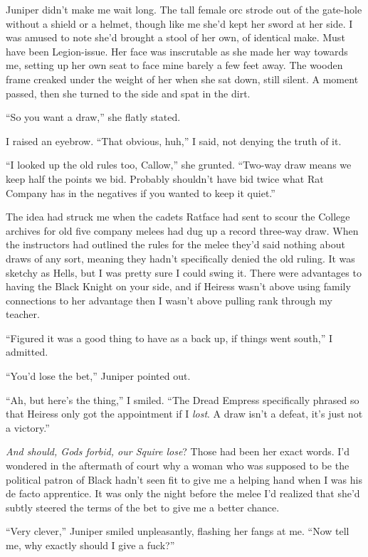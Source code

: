\documentclass[12pt, openany]{book}
\begin{document}
Juniper didn’t make me wait long. The tall female orc strode out of the gate-hole without a shield or a helmet, though like me she’d kept her sword at her side. I was amused to note she’d brought a stool of her own, of identical make. Must have been Legion-issue. Her face was inscrutable as she made her way towards me, setting up her own seat to face mine barely a few feet away. The wooden frame creaked under the weight of her when she sat down, still silent. A moment passed, then she turned to the side and spat in the dirt.

“So you want a draw,” she flatly stated.

I raised an eyebrow. “That obvious, huh,” I said, not denying the truth of it.

“I looked up the old rules too, Callow,” she grunted. “Two-way draw means we keep half the points we bid. Probably shouldn’t have bid twice what Rat Company has in the negatives if you wanted to keep it quiet.”

The idea had struck me when the cadets Ratface had sent to scour the College archives for old five company melees had dug up a record three-way draw. When the instructors had outlined the rules for the melee they’d said nothing about draws of any sort, meaning they hadn’t specifically denied the old ruling. It was sketchy as Hells, but I was pretty sure I could swing it. There were advantages to having the Black Knight on your side, and if Heiress wasn’t above using family connections to her advantage then I wasn’t above pulling rank through my teacher.

“Figured it was a good thing to have as a back up, if things went south,” I admitted.

“You’d lose the bet,” Juniper pointed out.

“Ah, but here’s the thing,” I smiled. “The Dread Empress specifically phrased so that Heiress only got the appointment if I \textit{lost}. A draw isn’t a defeat, it’s just not a victory.”

\textit{And should, Gods forbid, our Squire lose}? Those had been her exact words. I’d wondered in the aftermath of court why a woman who was supposed to be the political patron of Black hadn’t seen fit to give me a helping hand when I was his de facto apprentice. It was only the night before the melee I’d realized that she’d subtly steered the terms of the bet to give me a better chance.

“Very clever,” Juniper smiled unpleasantly, flashing her fangs at me. “Now tell me, why exactly should I give a fuck?”
\end{document}
